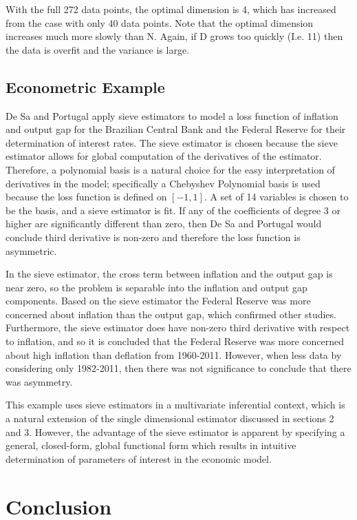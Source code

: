 \documentclass[12pt]{article}  %
\begin{document}
With the full 272 data points, the optimal dimension is 4, which has increased from the case with only 40 data points. Note that the optimal dimension increases much more slowly than N. Again, if D grows too quickly (I.e. 11) then the data is overfit and the variance is large. 


\subsection{Econometric Example}

De Sa and Portugal apply sieve estimators to model a loss function of inflation and output gap for the Brazilian Central Bank and the Federal Reserve for their determination of interest rates.  The sieve estimator is chosen because the sieve estimator allows for global computation of the derivatives of the estimator. Therefore, a polynomial basis is a natural choice for the easy interpretation of derivatives in the model; specifically a Chebyshev Polynomial basis is used because the loss function is defined on $[-1,1]$.  A set of 14 variables is chosen to be the basis, and a sieve estimator is fit. If any of the coefficients of degree 3 or higher are significantly different than zero, then De Sa and Portugal would conclude third derivative is non-zero and therefore the loss function is asymmetric. 

In the sieve estimator, the cross term between inflation and the output gap is near zero, so the problem is separable into the inflation and output gap components. Based on the sieve estimator the Federal Reserve was more concerned about inflation than the output gap, which confirmed other studies. Furthermore, the sieve estimator does have non-zero third derivative with respect to inflation, and so it is concluded that the Federal Reserve was more concerned about high inflation than deflation from 1960-2011. However, when less data by considering only 1982-2011, then there was not significance to conclude that there was asymmetry.  

This example uses sieve estimators in a multivariate inferential context, which is a natural extension of the single dimensional estimator discussed in sections 2 and 3. However, the advantage of the sieve estimator is apparent by specifying a general, closed-form, global functional form which results in intuitive determination of parameters of interest in the economic model. 


\section{Conclusion}
\end{document}
